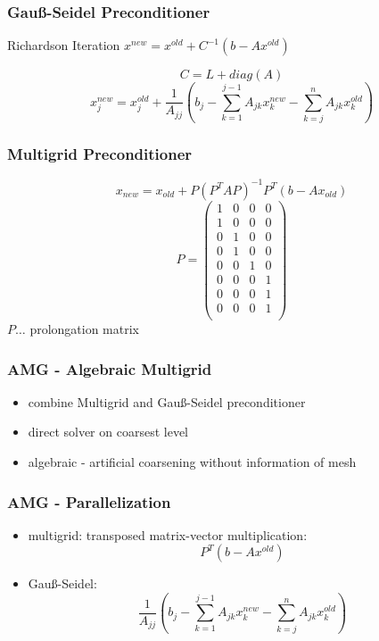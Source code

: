 \documentclass{beamer}
\begin{document}
\begin{frame}
\frametitle{Gau\ss-Seidel Preconditioner}
\begin{block}{Richardson Iteration}
$x^{new} = x^{old} + C^{-1} (b - Ax^{old})$
\end{block}
$$C = L + diag(A)$$
$$x_j^{new} = x_j^{old} + \frac{1}{A_{jj}} \left(b_{j} - \sum_{k=1}^{j-1} A_{jk}
x_k^{new} - \sum_{k=j}^{n} A_{jk} x_k^{old}\right)$$
\end{frame}

\begin{frame}
\frametitle{Multigrid Preconditioner}
$$x_{new} = x_{old} + P (P^{T} A P)^{-1} P^{T} (b - A x_{old})$$
$$P =
\begin{pmatrix}
  1 & 0 & 0 & 0 \\
  1 & 0 & 0 & 0 \\
  0 & 1 & 0 & 0 \\
  0 & 1 & 0 & 0 \\
  0 & 0 & 1 & 0 \\
  0 & 0 & 0 & 1 \\
  0 & 0 & 0 & 1 \\
  0 & 0 & 0 & 1 \\
\end{pmatrix}
$$
$P \dots$ prolongation matrix
\end{frame}

\begin{frame}
\frametitle{AMG - Algebraic Multigrid}
\begin{itemize}
  \item combine Multigrid and Gau\ss-Seidel preconditioner
  \item direct solver on coarsest level
  \item algebraic - artificial coarsening without information of mesh
\end{itemize}
\end{frame}

\begin{frame}
\frametitle{AMG - Parallelization}
\begin{itemize}
  \item multigrid: transposed matrix-vector multiplication:
    $$P^{T} (b-Ax^{old})$$
  \item Gau\ss-Seidel: \\ $$\frac{1}{A_{jj}} \left(b_{j} - \sum_{k=1}^{j-1} A_{jk}
x_k^{new} - \sum_{k=j}^{n} A_{jk} x_k^{old}\right)$$
\end{itemize}
\end{frame}
\end{document}
